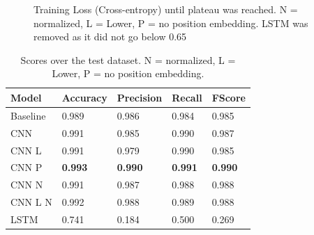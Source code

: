 \documentclass{jdmdh}
\begin{document}
\begin{figure}[!ht]
  \begin{center}
    \caption{Training Loss (Cross-entropy) until plateau was reached. N = normalized, L = Lower, P = no position embedding. LSTM was removed as it did not go below 0.65}
  \label{fig:loss}
  \end{center}
\end{figure}

\begin{table}[!ht]
\centering
\begin{tabular}{lllll}
\hline
Model    & Accuracy & Precision & Recall & FScore \\ \hline
Baseline & 0.989    & 0.986     & 0.984  & 0.985 \\
CNN      & 0.991    & 0.985     & 0.990  & 0.987  \\
CNN L    & 0.991    & 0.979     & 0.990  & 0.985  \\
CNN P    & \textbf{0.993}    & \textbf{0.990}& \textbf{0.991}  & \textbf{0.990}  \\
CNN N    & 0.991    & 0.987     & 0.988  & 0.988  \\
CNN L N  & 0.992    & 0.988     & 0.989  & 0.988  \\
LSTM     & 0.741    & 0.184     & 0.500  & 0.269  \\ \hline
\end{tabular}
\caption{Scores over the test dataset. N = normalized, L = Lower, P = no position embedding.}
\label{tab:scores}
\end{table}
\end{document}
